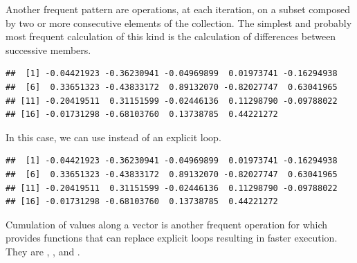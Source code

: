 \documentclass[krantz2]{krantz}\usepackage{knitr}%
\begin{document}
\begin{explainbox}
Another frequent pattern are operations, at each iteration, on a subset composed by two or more consecutive elements of the collection. The simplest and probably most frequent calculation of this kind is the calculation of differences between successive members.
\begin{knitrout}\footnotesize
{}\color{fgcolor}\begin{kframe}
\begin{alltt}
\hlstd{(}\hlstd{)}
 \hlkwb{<-} \hlstd{(}\hlstd{)}
 \hlkwb{<-} \hlstd{(} \hlopt{-} \hlstd{)}
   \hlstd{(} 
   \hlkwb{<-} \hlstd{a.vector[i} \hlopt{+} \hlstd{]} \hlopt{-} 
  \hlstd{\}}
\end{alltt}
\begin{verbatim}
##  [1] -0.04421923 -0.36230941 -0.04969899  0.01973741 -0.16294938
##  [6]  0.33651323 -0.43833172  0.89132070 -0.82027747  0.63041965
## [11] -0.20419511  0.31151599 -0.02446136  0.11298790 -0.09788022
## [16] -0.01731298 -0.68103760  0.13738785  0.44221272
\end{verbatim}
\end{kframe}
\end{knitrout}

In this case, we can use  instead of an explicit loop.
\begin{knitrout}\footnotesize
{}\color{fgcolor}\begin{kframe}
\begin{alltt}
 \hlkwb{<-} 
\end{alltt}
\begin{verbatim}
##  [1] -0.04421923 -0.36230941 -0.04969899  0.01973741 -0.16294938
##  [6]  0.33651323 -0.43833172  0.89132070 -0.82027747  0.63041965
## [11] -0.20419511  0.31151599 -0.02446136  0.11298790 -0.09788022
## [16] -0.01731298 -0.68103760  0.13738785  0.44221272
\end{verbatim}
\end{kframe}
\end{knitrout}

Cumulation of values along a vector is another frequent operation for which \Rlang provides functions that can replace explicit  loops resulting in faster execution. They are , ,  and .

\end{explainbox}
\end{document}
